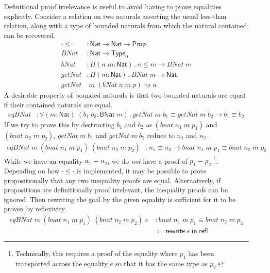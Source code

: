 \documentclass{article}
\newcommand{\kw}[1]{\mathsf{#1}}
\begin{document}
Definitional proof irrelevance is useful to avoid having to prove equalities explicitly.
Consider a relation on two naturals asserting the usual less-than relation,
along with a type of bounded naturals from which the natural contained can be recovered.
%
\begin{align*}
  \cdot \le \cdot &: \kw{Nat} \to \kw{Nat} \to \kw{Prop} \\
  \mathit{BNat} &: \kw{Nat} \to \kw{Type}_0 \\
  \mathit{bNat} &: \Pi (n \; m : \kw{Nat})\mathpunct{.} n \le m \to \mathit{BNat} \; m \\
  \mathit{getNat} &: \Pi (m : \kw{Nat})\mathpunct{.} \mathit{BNat} \; m \to \kw{Nat} \\
  \mathit{getNat} &\; m \; (\mathit{bNat} \; n \; m \; p) \rightsquigarrow n
\end{align*}
%
A desirable property of bounded naturals is that
two bounded naturals are equal if their contained naturals are equal.
%
\begin{align*}
  \mathit{eqBNat} &: \forall (m : \kw{Nat}) \; (b_1 \; b_2 : \kw{BNat} \; m) \mathpunct{.}
    \mathit{getNat} \; m \; b_1 \equiv \mathit{getNat} \; m \; b_2 \to b_1 \equiv b_2
\end{align*}
%
If we try to prove this by destructing $b_1$ and $b_2$ as
$(\mathit{bnat} \; n_1 \; m \; p_1)$ and $(\mathit{bnat} \; n_2 \; m \; p_2)$,
$\mathit{getNat} \; m \; b_1$ and $\mathit{getNat} \; m \; b_2$ reduce to $n_1$ and $n_2$.
%
\begin{align*}
  \mathit{eqBNat} \; m \; (\mathit{bnat} \; n_1 \; m \; p_1) \; (\mathit{bnat} \; n_2 \; m \; p_2)
    &: n_1 \equiv n_2 \to \mathit{bnat} \; n_1 \; m \; p_1 \equiv \mathit{bnat} \; n_2 \; m \; p_2
\end{align*}
%
While we have an equality $n_1 \equiv n_2$,
we do \emph{not} have a proof of $p_1 \equiv p_2$%
\footnote{Technically, this requires a proof of the equality
where $p_1$ has been transported across the equality $e$
so that it has the same type as $p_2$.}.
Depending on how $\cdot \le \cdot$ is implemented,
it may be possible to prove propositionally that any two inequality proofs are equal.
Alternatively, if propositions are definitionally proof irrelevant,
the inequality proofs can be ignored.
Then rewriting the goal by the given equality is sufficient
for it to be proven by reflexivity.
%
\begin{align*}
  \mathit{eqBNat} \; m \; (\mathit{bnat} \; n_1 \; m \; p_1) \; (\mathit{bnat} \; n_2 \; m \; p_2) \; e \;
    &: \mathit{bnat} \; n_1 \; m \; p_1 \equiv \mathit{bnat} \; n_2 \; m \; p_2 \\
    &\coloneqq \kw{rewrite} \; e \; \kw{in} \; \kw{refl}
\end{align*}
\end{document}
